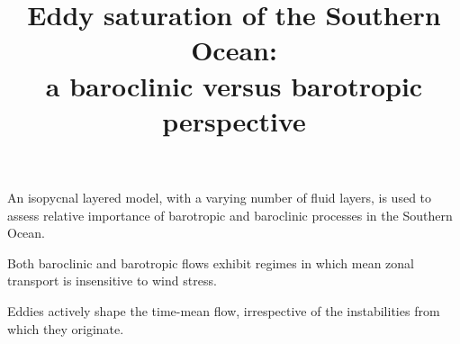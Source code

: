 \documentclass{agujournal2019}
\begin{document}
\justify
\title{Eddy saturation of the Southern Ocean:\\ a baroclinic versus barotropic perspective}





\begin{keypoints}
\item An isopycnal layered model, with a varying number of fluid layers, is used to assess relative importance of barotropic and baroclinic processes in the Southern Ocean.
\item Both baroclinic and barotropic flows exhibit regimes in which mean zonal transport is insensitive to wind stress.
\item Eddies actively shape the time-mean flow, irrespective of the instabilities from which they originate. 
\end{keypoints}

%
%
\end{document}
